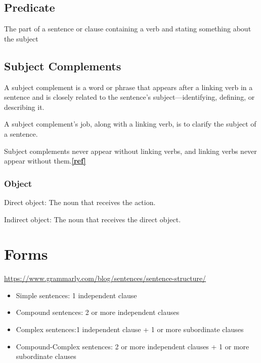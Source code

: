 \documentclass{book}
\begin{document}
\section{Predicate}

The part of a sentence or clause containing a verb and stating something about the subject

\section{Subject Complements}

A subject complement is a word or phrase that appears after a linking verb in a sentence and is closely related to the sentence’s subject—identifying, defining, or describing it.

A subject complement’s job, along with a linking verb, is to clarify the subject of a sentence.

Subject complements never appear without linking verbs, and linking verbs never appear without them.\textbf{\href{https://www.grammarly.com/blog/grammar/subject-complement/}{[ref]}}

\subsection{Object}

Direct object: The noun that receives the action.

Indirect object: The noun that receives the direct object.

\chapter{Forms}

\url{https://www.grammarly.com/blog/sentences/sentence-structure/}

\begin{itemize}
	\item Simple sentences: 1 independent clause
	\item Compound sentences: 2 or more independent clauses
	\item Complex sentences:1 independent clause + 1 or more subordinate clauses
	\item Compound-Complex sentences: 2 or more independent clauses + 1 or more subordinate clauses
\end{itemize}
\end{document}
